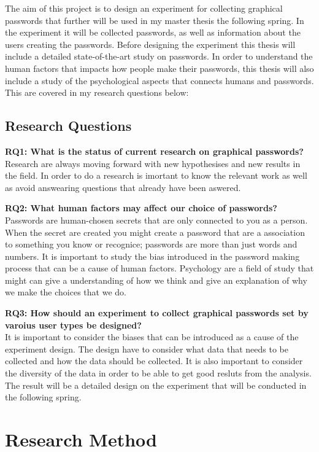   The aim of this project is to design an experiment for collecting graphical passwords that further will be used in my master thesis the following spring. In the experiment it will be collected passwords, as well as information about the users creating the passwords. Before designing the experiment this thesis will include a detailed state-of-the-art study on passwords. In order to understand the human factors that impacts how people make their passwords, this thesis will also include a study of the psychological aspects that connects humans and passwords. This are covered in my research questions below:

  \subsection*{Research Questions}

    {\bf RQ1: What is the status of current research on graphical passwords? } \\
    Research are always moving forward with new hypothesises and new results in the field. In order to do a research is imortant to know the relevant work as well as avoid answearing questions that already have been aswered.
    
    {\bf RQ2: What human factors may affect our choice of passwords?} \\
    Passwords are human-chosen secrets that are only connected to you as a person. When the secret are created you might create a password that are a association to something you know or recognice; passwords are more than just words and numbers. It is important to study the bias introduced in the password making process that can be a cause of human factors. Psychology are a field of study that might can give a understanding of how we think and give an explanation of why we make the choices that we do. 
    
    {\bf RQ3: How should an experiment to collect graphical passwords set by varoius user types be designed?} \\
    It is important to consider the biases that can be introduced as a cause of the experiment design. The design have to consider what data that needs to be collected and how the data should be collected. It is also important to consider the diversity of the data in order to be able to get good resluts from the analysis. The result will be a detailed design on the experiment that will be conducted in the following spring. 

\section{Research Method}


